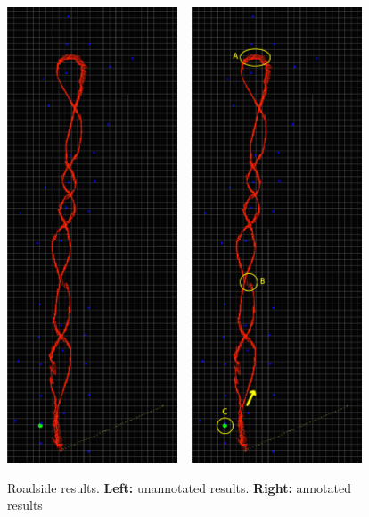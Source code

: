 \documentclass[12pt,oneside,a4paper,draft]{book}
\begin{document}
\begin{figure}
  \centering
  \includegraphics[width=0.45\textwidth]{figs/roadside-results}
  ~
  \includegraphics[width=0.45\textwidth]{figs/roadside-results-annotated}
  \caption{Roadside results. \textbf{Left:} unannotated
    results. \textbf{Right:} annotated results}
  \label{fig:roadside-results}
\end{figure}
\end{document}
